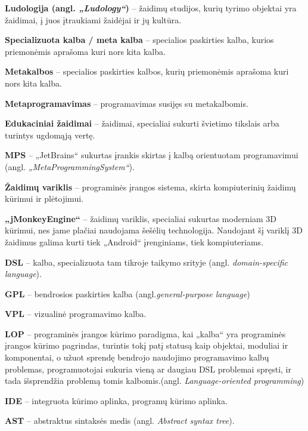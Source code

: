\documentclass{VUMIFPSkursinis}
\begin{document}
\printbibliography[heading=bibintoc]  


\textbf{Ludologija (angl. \textit{„Ludology“})} -- žaidimų studijos, kurių tyrimo objektai yra žaidimai, į juos įtraukiami žaidėjai ir jų kultūra.\cite{frasca1999ludology}

\textbf{Specializuota kalba / meta kalba} -- specialios paskirties kalba, kurios priemonėmis aprašoma kuri nors kita kalba.

\textbf{Metakalbos} -- specialios paskirties kalbos, kurių priemonėmis aprašoma kuri nors kita kalba.

\textbf{Metaprogramavimas} -- programavimas susijęs su metakalbomis.

\textbf{Edukaciniai žaidimai} -- žaidimai, specialiai sukurti švietimo tikslais arba turintys ugdomąją vertę.

\textbf{MPS} -- „JetBrains“ sukurtas įrankis skirtas į kalbą orientuotam programavimui (angl. \textit{„MetaProgrammingSystem“}).

\textbf{Žaidimų variklis} --  programinės įrangos sistema, skirta kompiuterinių žaidimų kūrimui ir plėtojimui.

\textbf{„jMonkeyEngine“} -- žaidimų variklis, specialiai sukurtas moderniam 3D kūrimui, nes jame plačiai naudojama šešėlių technologija. Naudojant šį variklį 3D žaidimus galima kurti tiek „Android“ įrenginiams, tiek kompiuteriams.


\textbf{DSL} -- kalba, specializuota tam tikroje taikymo srityje (angl.\textit{ domain-specific language}).

\textbf{GPL} -- bendrosios paskirties kalba (angl.\textit{general-purpose language})

\textbf{VPL} -- vizualinė programavimo kalba.

\textbf{LOP} -- programinės įrangos kūrimo paradigma, kai „kalba“ yra programinės įrangos kūrimo pagrindas, turintis tokį patį statusą kaip objektai, moduliai ir komponentai, o užuot sprendę bendrojo naudojimo programavimo kalbų problemas, programuotojai sukuria vieną ar daugiau DSL problemai spręsti, ir tada išsprendžia problemą tomis kalbomis.(angl. \textit{Language-oriented programming})

\textbf{IDE} -- integruota kūrimo aplinka, programų kūrimo aplinka.

\textbf{AST} -- abstraktus sintaksės medis (angl. \textit{Abstract syntax tree}).
\end{document}

